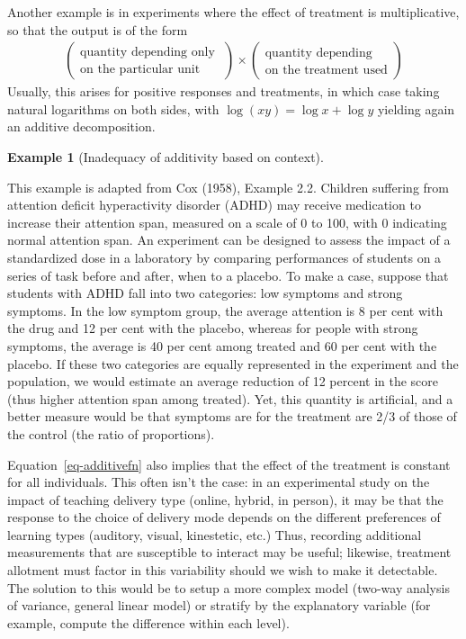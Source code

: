 \documentclass[
  11pt,
  letterpaper,
]{scrbook}
\theoremstyle{definition}
\theoremstyle{definition}
\newtheorem{example}{Example}[chapter]
\theoremstyle{remark}
\begin{document}
Another example is in experiments where the effect of treatment is
multiplicative, so that the output is of the form \begin{align*}
\begin{pmatrix} \text{quantity depending only } \\ 
\text{on the particular unit} 
\end{pmatrix} \times
\begin{pmatrix} \text{quantity depending} \\
 \text{on the treatment used}\end{pmatrix}
\end{align*} Usually, this arises for positive responses and treatments,
in which case taking natural logarithms on both sides, with
\(\log(xy) = \log x + \log y\) yielding again an additive decomposition.

\begin{example}[Inadequacy of additivity based on
context]\protect\hypertarget{exm-additivity-context}{}\label{exm-additivity-context}

This example is adapted from Cox (1958), Example 2.2. Children suffering
from attention deficit hyperactivity disorder (ADHD) may receive
medication to increase their attention span, measured on a scale of 0 to
100, with 0 indicating normal attention span. An experiment can be
designed to assess the impact of a standardized dose in a laboratory by
comparing performances of students on a series of task before and after,
when to a placebo. To make a case, suppose that students with ADHD fall
into two categories: low symptoms and strong symptoms. In the low
symptom group, the average attention is 8 per cent with the drug and 12
per cent with the placebo, whereas for people with strong symptoms, the
average is 40 per cent among treated and 60 per cent with the placebo.
If these two categories are equally represented in the experiment and
the population, we would estimate an average reduction of 12 percent in
the score (thus higher attention span among treated). Yet, this quantity
is artificial, and a better measure would be that symptoms are for the
treatment are 2/3 of those of the control (the ratio of proportions).

\end{example}

Equation~\ref{eq-additivefn} also implies that the effect of the
treatment is constant for all individuals. This often isn't the case: in
an experimental study on the impact of teaching delivery type (online,
hybrid, in person), it may be that the response to the choice of
delivery mode depends on the different preferences of learning types
(auditory, visual, kinestetic, etc.) Thus, recording additional
measurements that are susceptible to interact may be useful; likewise,
treatment allotment must factor in this variability should we wish to
make it detectable. The solution to this would be to setup a more
complex model (two-way analysis of variance, general linear model) or
stratify by the explanatory variable (for example, compute the
difference within each level).
\end{document}
